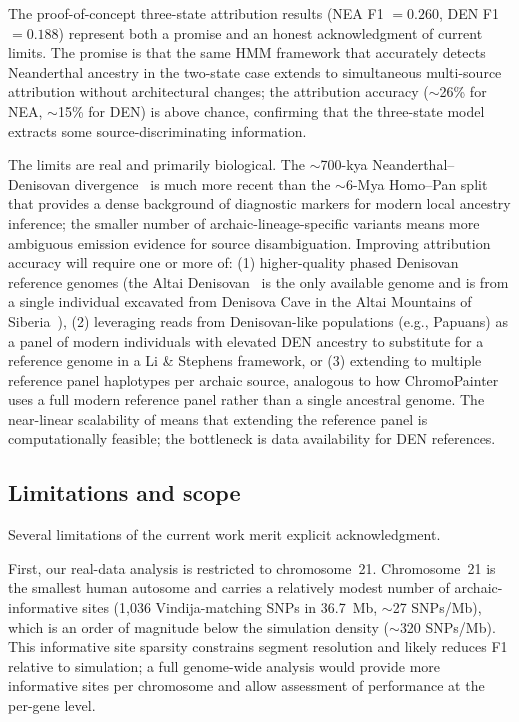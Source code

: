 The proof-of-concept three-state attribution results (NEA F1 $= 0.260$, DEN
F1 $= 0.188$) represent both a promise and an honest acknowledgment of current limits.
The promise is that the same HMM framework that accurately detects Neanderthal
ancestry in the two-state case extends to simultaneous multi-source attribution
without architectural changes; the attribution accuracy ($\sim$26\% for NEA,
$\sim$15\% for DEN) is above chance, confirming that the three-state model
extracts some source-discriminating information.

The limits are real and primarily biological.
The $\sim$700-kya Neanderthal--Denisovan divergence~\citep{prufer2014complete}
is much more recent than the $\sim$6-Mya Homo--Pan split that provides a dense
background of diagnostic markers for modern local ancestry inference;
the smaller number of archaic-lineage-specific variants means more ambiguous
emission evidence for source disambiguation.
Improving attribution accuracy will require one or more of:
(1) higher-quality phased Denisovan reference genomes
(the Altai Denisovan~\citep{meyer2012high} is the only available genome and is
from a single individual excavated from Denisova Cave in the Altai Mountains of Siberia~\citep{reich2010genetic}),
(2) leveraging reads from Denisovan-like populations (e.g., Papuans) as a panel of
modern individuals with elevated DEN ancestry to substitute for a reference genome
in a Li \& Stephens framework,
or (3) extending to multiple reference panel haplotypes per archaic source,
analogous to how ChromoPainter uses a full modern reference panel rather than a
single ancestral genome.
The near-linear scalability of \AP{} means that extending the reference panel
is computationally feasible; the bottleneck is data availability for DEN references.

\subsection*{Limitations and scope}

Several limitations of the current work merit explicit acknowledgment.

First, our real-data analysis is restricted to chromosome~21.
Chromosome~21 is the smallest human autosome and carries a relatively modest
number of archaic-informative sites (1,036 Vindija-matching SNPs in 36.7~Mb,
$\sim$27 SNPs/Mb), which is an order of magnitude below the simulation density
($\sim$320 SNPs/Mb).
This informative site sparsity constrains segment resolution and likely reduces
F1 relative to simulation; a full genome-wide analysis would provide more informative
sites per chromosome and allow assessment of \AP{} performance at the per-gene level.

